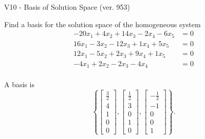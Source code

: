 \begin{exercise}
  \begin{exerciseTitle}V10 - Basis of Solution Space (ver. 953)\end{exerciseTitle}
  \begin{exerciseStatement}
    Find a basis for the solution space of the homogeneous system 
\begin{align*}
 -20 x_ 1 + 4 x_ 2 + 14 x_ 3 -2 x_ 4 -6 x_ 5 &= 0  \\ 
  16 x_ 1 -3 x_ 2 -12 x_ 3 + 1 x_ 4 + 5 x_ 5 &= 0  \\ 
  12 x_ 1 -5 x_ 2 + 2 x_ 3 + 9 x_ 4 + 1 x_ 5 &= 0  \\ 
  -4 x_ 1 + 2 x_ 2 -2 x_ 3 -4 x_ 4 &= 0  \\ 
 \end{align*}


 
  \end{exerciseStatement}

  \begin{exerciseAnswer}
   A basis is   
\[\left\{\left[\begin{array}{c}
\frac{3}{2} \\
4 \\
1 \\
0 \\
0
\end{array}\right] , \left[\begin{array}{c}
\frac{1}{2} \\
3 \\
0 \\
1 \\
0
\end{array}\right] , \left[\begin{array}{c}
-\frac{1}{2} \\
-1 \\
0 \\
0 \\
1
\end{array}\right]\right\}.\]

  


  \end{exerciseAnswer}
\end{exercise}